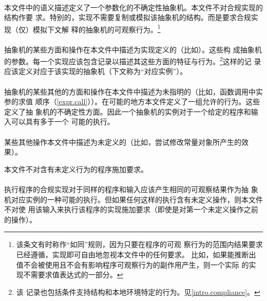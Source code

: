 \paragraph{} %
本文件中的语义描述定义了一个参数化的不确定性抽象机。本文件不对合规实现的结构作要
求。特别的，实现不需要复制或模拟该抽象机的结构。而是要求合规实现（仅）模拟下文解
释的抽象机的可观察行为。\footnote{该条文有时称作“如同”规则，因为只要在程序的可观
察行为的范围内结果要求已经遵循，实现即可自由地忽视本文件中的任何要求。
比如，如果能推断出值不会被使用且不会有影响程序可观察行为的副作用产生，则一个实际
的实现不需要求值表达式的一部分。}

\paragraph{} %
抽象机的某些方面和操作在本文件中描述为实现定义的（比如）。这些构
成抽象机的参数。每一个实现应该包含记录以描述其这些方面的特征与行为。\footnote{该
记录也包括条件支持结构和本地环境特定的行为。见\ref{intro.compliance}。}这样的记
录应该定义对应于该实现的抽象机（下文称为“对应实例”）。

\paragraph{} %
抽象机的某些其他的方面和操作在本文件中描述为未指明的（比如，函数调用中实参的求值
顺序（\ref{expr.call}））。在可能的地方本文件定义了一组允许的行为。这些定义了抽
象机的不确定性方面。因此一个抽象机的实例对于一个给定的程序和输入可以具有多于一个
可能的执行。

\paragraph{} %
某些其他操作本文件中描述为未定义的（比如，尝试修改常量对象所产生的效果）。

\begin{note}
  本文件不对含有未定义行为的程序施加要求。
\end{note}

\paragraph{} %
执行\wellform{}程序的合规实现对于同样的程序和输入应该产生相同的可观察结果作为抽
象机对应实例的一种可能的执行。但如果任何这样的执行含有未定义操作，则本文件不对使
用该输入来执行该程序的实现施加要求（即使是对第一个未定义操作之前的操作）。

